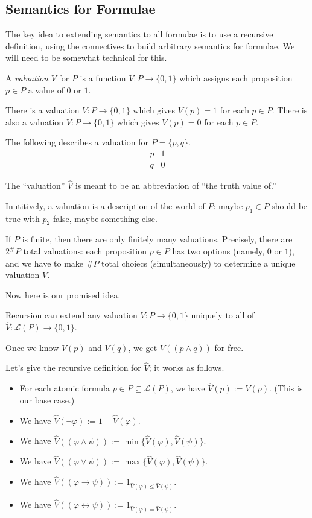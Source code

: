 \subsection{Semantics for Formulae}
The key idea to extending semantics to all formulae is to use a recursive definition, using the connectives to build arbitrary semantics for formulae. We will need to be somewhat technical for this.
\begin{definition}[Valuation]
	A \textit{valuation} $V$ for $P$ is a function $V:P\to\{0,1\}$ which assigns each proposition $p\in P$ a value of $0$ or $1$.
\end{definition}
\begin{example}
	There is a valuation $V:P\to\{0,1\}$ which gives $V(p)=1$ for each $p\in P$. There is also a valuation $V:P\to\{0,1\}$ which gives $V(p)=0$ for each $p\in P$.
\end{example}
\begin{example}
	The following describes a valuation for $P=\{p,q\}$.
	\[\begin{array}{c|c}
		p & 1 \\
		q & 0
	\end{array}\]
\end{example}
\begin{remark}
	The ``valuation'' $\hat V$ is meant to be an abbreviation of ``the truth value of.''
\end{remark}
Inutitively, a valuation is a description of the world of $P$: maybe $p_1\in P$ should be true with $p_2$ false, maybe something else.
\begin{remark}
	If $P$ is finite, then there are only finitely many valuations. Precisely, there are $2^\#P$ total valuations: each proposition $p\in P$ has two options (namely, $0$ or $1$), and we have to make $\#P$ total choiecs (simultaneously) to determine a unique valuation $V$.
\end{remark}
Now here is our promised idea.
\begin{idea}
	Recursion can extend any valuation $V:P\to\{0,1\}$ uniquely to all of $\hat V:\mathcal L(P)\to\{0,1\}$.
\end{idea}
\begin{example}
	Once we know $V(p)$ and $V(q)$, we get $V((p\land q))$ for free.
\end{example}
Let's give the recursive definition for $\hat V$; it works as follows.
\begin{itemize}
	\item For each atomic formula $p\in P\subseteq\mathcal L(P)$, we have $\hat V(p):=V(p)$. (This is our base case.)
	\item We have $\hat V(\lnot\varphi):=1-\hat V(\varphi)$.
	\item We have $\hat V((\varphi\land\psi)):=\min\{\hat V(\varphi),\hat V(\psi)\}$.
	\item We have $\hat V((\varphi\lor\psi)):=\max\{\hat V(\varphi),\hat V(\psi)\}$.
	\item We have $\hat V((\varphi\to\psi)):=1_{\hat V(\varphi)\le\hat V(\psi)}$.
	\item We have $\hat V((\varphi\leftrightarrow\psi)):=1_{\hat V(\varphi)=\hat V(\psi)}$.
\end{itemize}
